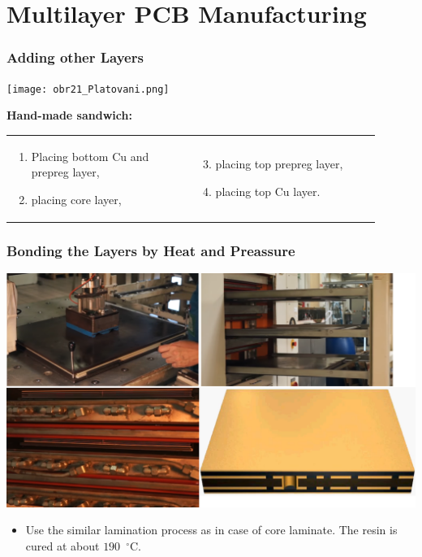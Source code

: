 \documentclass{beamer}
\begin{document}
\section{\texorpdfstring{Multilayer PCB Manufacturing}{Multilayer PCB Manufacturing}}
	\begin{frame}
    \frametitle{Adding other Layers}

		\begin{center}
			\texttt{[image: obr21\_Platovani.png]}
		\end{center}
		\begin{flushleft}
			\textbf{Hand-made sandwich:}
		\end{flushleft}
		\begin{center}
			\begin{tabular}{p{0.45\linewidth} p{0.45\linewidth}}
			
		  \begin{enumerate}
			  \setcounter{enumi}{0}
			  \item Placing bottom Cu and prepreg layer,
			  \item placing core layer,
		  \end{enumerate}
			&
			\begin{enumerate}
			  \setcounter{enumi}{2}
			  \item placing top prepreg layer,
			  \item placing top Cu layer.
		  \end{enumerate}
			\end{tabular}
		\end{center}
	\end{frame}
	\begin{frame}
    \frametitle{Bonding the Layers by Heat and Preassure}

		\begin{center}
			\includegraphics[scale=0.15]{obr11_vnejsiCuFilm.png}
		\end{center}
		
		\begin{itemize}
			\item Use the similar lamination process as in case of core laminate. The resin is cured at about $190$~$^\circ$C.
		\end{itemize}
	\end{frame}
\end{document}
